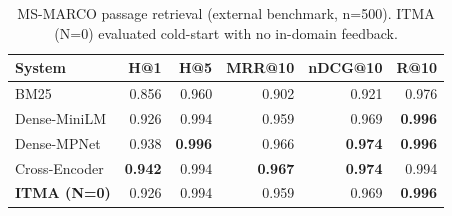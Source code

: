 \begin{table}[!htbp]
\centering
\small
\caption{MS-MARCO passage retrieval (external benchmark, n=500).
ITMA (N=0) evaluated cold-start with no in-domain feedback.}
\label{tab:msmarco}
\begin{tabular}{lrrrrr}
\toprule
System & H@1 & H@5 & MRR@10 & nDCG@10 & R@10 \\
\midrule
BM25 & 0.856 & 0.960 & 0.902 & 0.921 & 0.976 \\
Dense-MiniLM & 0.926 & 0.994 & 0.959 & 0.969 & \textbf{0.996} \\
Dense-MPNet & 0.938 & \textbf{0.996} & 0.966 & \textbf{0.974} & \textbf{0.996} \\
Cross-Encoder & \textbf{0.942} & 0.994 & \textbf{0.967} & \textbf{0.974} & 0.994 \\
\textbf{ITMA (N=0)} & 0.926 & 0.994 & 0.959 & 0.969 & \textbf{0.996} \\
\bottomrule
\end{tabular}
\end{table}
